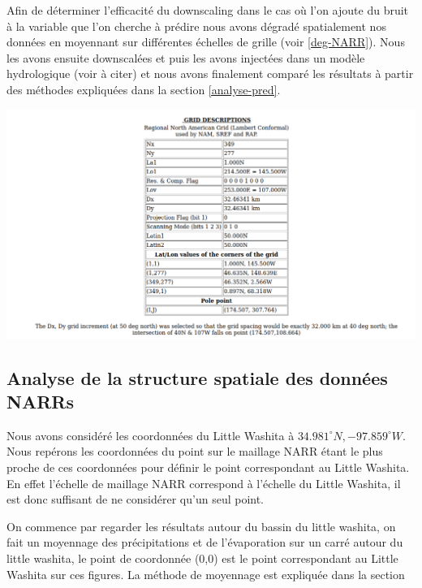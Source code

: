 \documentclass[a4paper,11pt]{article}
\begin{document}
Afin de déterminer l'efficacité du downscaling dans le cas où l'on ajoute du bruit à la variable que l'on cherche à prédire nous avons dégradé spatialement nos données en moyennant sur différentes échelles de grille (voir \ref{deg-NARR}).
Nous les avons ensuite downscalées et puis les avons injectées dans un modèle hydrologique (voir à citer) et nous avons finalement comparé les résultats à partir des méthodes expliquées dans la section \ref{analyse-pred}.


\begin{center}
	\label{maillage NARR}
	\captionsetup{type=figure}
	\includegraphics[scale=0.4]{grid_prop.png}
\end{center} 

\subsection{Analyse de la structure spatiale des données NARRs}
\label{ch:spat-NARR}

Nous avons considéré les coordonnées du Little Washita à $34.981^{\circ}N,-97.859^{\circ}W$. Nous repérons les coordonnées du point sur le maillage NARR étant le plus proche de ces coordonnées pour définir le point correspondant au Little Washita. En effet l'échelle de maillage NARR  correspond à l'échelle du Little Washita, il est donc suffisant de ne considérer qu'un seul point.

On commence par regarder les résultats autour du bassin du little washita, on fait un moyennage des précipitations et de l'évaporation sur un carré autour du little washita, le point de coordonnée (0,0) est le point correspondant au Little Washita sur ces figures. La méthode de moyennage est expliquée dans la section 
\end{document}
